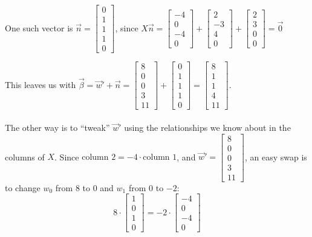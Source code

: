 \documentclass[11pt]{article}
\begin{document}
\begin{prob}
\begin{subprob}
\begin{solution}
One such vector is $\vec n = \begin{bmatrix} 0 \\ 1 \\ 1 \\ 1 \\ 0 \end{bmatrix}$, since
$X\vec n = \begin{bmatrix} -4 \\ 0 \\ -4 \\ 0 \end{bmatrix} + \begin{bmatrix} 2 \\ -3 \\ 4 \\ 0 \end{bmatrix} + \begin{bmatrix} 2 \\ 3 \\ 0 \\ 0 \end{bmatrix} = \vec 0$

This leaves us with $\vec \beta=\vec w' + \vec n = \begin{bmatrix} 8 \\ 0 \\ 0 \\ 3 \\ 11 \end{bmatrix} + \begin{bmatrix} 0 \\ 1 \\ 1 \\ 1 \\ 0 \end{bmatrix} = \boxed{\begin{bmatrix} 8 \\ 1 \\ 1 \\ 4 \\ 11 \end{bmatrix}}$.
\\
\\The other way is to ``tweak'' $\vec w'$ using the relationships we know about in the columns of $X$. Since $\text{column 2} = -4 \cdot \text{column 1}$, and $\vec w' = \begin{bmatrix} 8 \\ 0 \\ 0 \\ 3 \\ 11 \end{bmatrix}$, an easy swap is to change $w_0$ from $8$ to $0$ and $w_1$ from 0 to $-2$: $$8 \cdot \begin{bmatrix} 1 \\ 0 \\ 1 \\ 0 \end{bmatrix} = -2 \cdot \begin{bmatrix} -4 \\ 0 \\ -4 \\ 0 \end{bmatrix}$$


\end{solution}
\end{subprob}
\end{prob}
\end{document}
